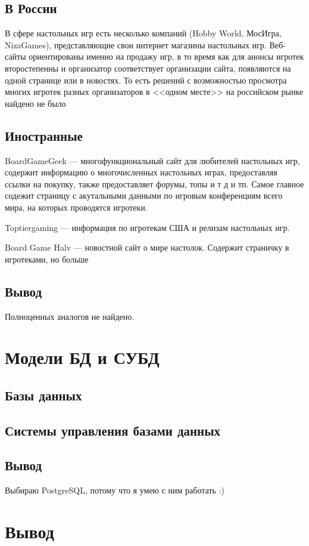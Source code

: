 \subsection{В России}

В сфере настольных игр есть несколько компаний (Hobby World, МосИгра,
NizaGames), представляющие свои интернет магазины настольных игр. Веб-сайты
ориентированы именно на продажу игр, в то время как для анонсы игротек
второстепенны и организатор соответствует организации сайта, появляются на одной
странице или в новостях. То есть решений с возможностью просмотра многих игротек
разных организаторов в <<одном месте>> на российском рынке найдено не было

\subsection{Иностранные}

BoardGameGeek --- многофункциональный сайт для любителей настольных игр,
содержит информацию о многочисленных настольных играх, предоставляя ссылки на
покупку, также предоставляет форумы, топы и т д и тп. Самое главное содежит
страницу с акутальными данными по игровым конференциям всего мира, на которых
проводятся игротеки.

Toptiergaming --- информация по игротекам США и релизам настольных игр.

Board Game Halv --- новостной сайт о мире настолок. Содержит страничку в
игротеками, но больше

\subsection{Вывод}

Полноценных аналогов не найдено.

\section{Модели БД и СУБД}

\subsection{Базы данных}

\subsection{Системы управления базами данных}

\subsection{Вывод}

Выбираю PostgreSQL, потому что я умею с ним работать :)

\section{Вывод}
